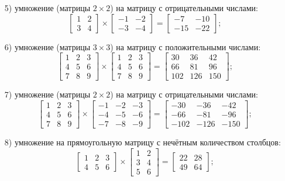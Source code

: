 \documentclass[a4paper,12pt]{article}
\begin{document}
\begin{enumerate}
		\item[5)] умножение (матрицы $2 \times 2$) на матрицу с отрицательными числами:
\[ \begin{bmatrix}
1 & 2 \\
3 & 4
\end{bmatrix} \times 
\begin{bmatrix}
-1 & -2 \\
-3 & -4
\end{bmatrix} =
\begin{bmatrix}
-7 & -10 \\
-15 & -22
\end{bmatrix}; \]


		\item[6)] умножение (матрицы $3 \times 3$) на матрицу с положительными числами:
\[ \begin{bmatrix}
1 & 2 & 3 \\
4 & 5 & 6 \\
7 & 8 & 9 
\end{bmatrix} \times 
\begin{bmatrix}
1 & 2 & 3 \\
4 & 5 & 6 \\
7 & 8 & 9 
\end{bmatrix} =
\begin{bmatrix}
30 & 36 & 42 \\
66 & 81 & 96 \\
102 & 126 & 150 
\end{bmatrix}; \]

		\item[7)] умножение (матрицы $2 \times 2$) на матрицу с отрицательными числами:
\[ \begin{bmatrix}
1 & 2 & 3 \\
4 & 5 & 6 \\
7 & 8 & 9 
\end{bmatrix} \times 
\begin{bmatrix}
-1 & -2 & -3 \\
-4 & -5 & -6 \\
-7 & -8 & -9 
\end{bmatrix} =
\begin{bmatrix}
-30 & -36 & -42 \\
-66 & -81 & -96 \\
-102 & -126 & -150 
\end{bmatrix}; \]

	\item[8)] умножение на прямоугольную матрицу с нечётным количеством столбцов:
\[ \begin{bmatrix}
1 & 2 & 3\\
4 & 5 & 6
\end{bmatrix} \times 
\begin{bmatrix}
1 & 2 \\
3 & 4 \\
5 & 6
\end{bmatrix} =
\begin{bmatrix}
22 & 28 \\
49 & 64
\end{bmatrix}; \]


\end{enumerate}
\end{document}
